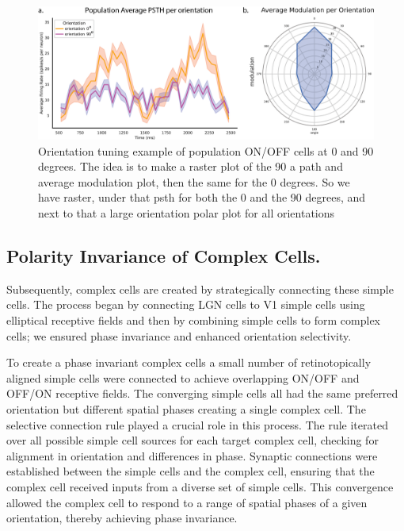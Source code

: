 \documentclass[12pt]{article}
\begin{document}
\begin{figure}[H]
    \centering
    \includegraphics[width=1.0 \textwidth]{figures/figure_simple_orientation_tuning.png}
    \caption{Orientation tuning example of population ON/OFF cells at 0 and 90 degrees. The idea is to make a raster plot of the 90 a path and average modulation plot, then the same for the 0 degrees. So we have raster, under that psth  for both the 0 and the 90 degrees, and next to that a large orientation polar plot for all orientations}
    \label{fig:simple cell orientation tuning}
\end{figure}

\subsection{Polarity Invariance of Complex Cells.}
Subsequently, complex cells are created by strategically connecting these simple cells. The process began by connecting LGN cells to V1 simple cells using elliptical receptive fields and then by combining simple cells to form complex cells; we ensured phase invariance and enhanced orientation selectivity.

To create a phase invariant complex cells a small number of retinotopically aligned simple cells were connected to achieve overlapping ON/OFF and OFF/ON receptive fields. The converging simple cells all had the same preferred orientation but different spatial phases creating a single complex cell. The selective connection rule played a crucial role in this process. The rule iterated over all possible simple cell sources for each target complex cell, checking for alignment in orientation and differences in phase. Synaptic connections were established between the simple cells and the complex cell, ensuring that the complex cell received inputs from a diverse set of simple cells. This convergence allowed the complex cell to respond to a range of spatial phases of a given orientation, thereby achieving phase invariance.
\end{document}
